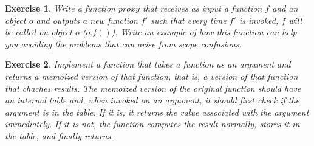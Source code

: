 \documentclass{article}
\newtheorem{ex}{Exercise}[section]
\begin{document}
\begin{ex} 
Write a function $proxy$ that receives as input a function $f$ and an object $o$
and outputs a new function $f'$ such that every time $f'$ is invoked, $f$ will be
called on object $o$ ($o.f()$). Write an example of how this function can 
help you avoiding the problems that can arise from scope confusions. 
\end{ex}

\begin{ex}
Implement a function that takes a function as an argument and
returns a \textit{memoized} version of that function, that is, a version of that function
that \textit{chaches} results. The \textit{memoized} version of the original function
should have an internal table and, when invoked on an argument, it should first check
if the argument is in the table. If it is, it returns the value associated with the argument 
immediately. If it is not, the function computes the result normally, stores it in the table, 
and finally returns.   
\end{ex}
\end{document}
